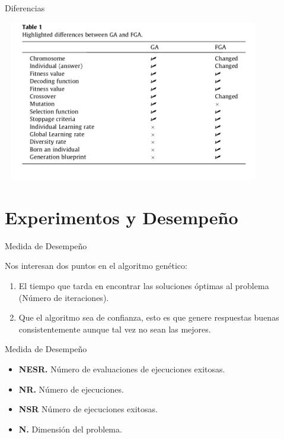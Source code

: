 \documentclass[10pt]{beamer}
\begin{document}
\begin{frame}{Diferencias}

\includegraphics[width=11.5cm, height=7cm]{diferencias}

\end{frame}

\section{Experimentos y Desempeño}

\begin{frame}{Medida de Desempeño}
	
	
	Nos interesan dos puntos en el algoritmo genético:
	
	\begin{enumerate}
	
		\item El \alert{tiempo} que tarda en encontrar las soluciones óptimas al problema
		(Número de iteraciones).
		
		\item Que el algoritmo sea de confianza, esto es que genere respuestas buenas
		\alert{consistentemente} aunque tal vez no sean las mejores.
		
		
	\end{enumerate}
	
\end{frame}


\begin{frame}{Medida de Desempeño}
	\begin{itemize}[<+- | alert@+>]
    
    	\item \textbf{NESR.} Número de evaluaciones de ejecuciones
    	 exitosas.
    	
    	\item \textbf{NR.} Número de ejecuciones.
    	
    
    
    	\item \textbf{NSR} Número de ejecuciones exitosas.
    
    	\item \textbf{N.} Dimensión del problema.
  
    \end{itemize}
    

\end{frame}
\end{document}
